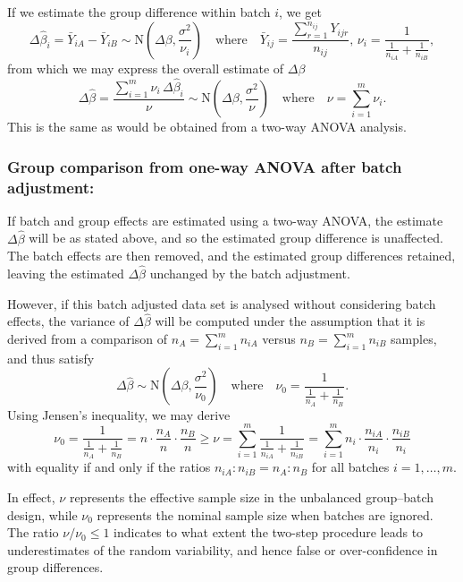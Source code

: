 \documentclass{bio}
\begin{document}
If we estimate the group difference within batch $i$, we get
\begin{equation}
\Delta\hat{\beta}_i=\bar{Y}_{iA}-\bar{Y}_{iB}\sim\text{N}\left(\Delta\beta,\frac{\sigma^2}{\nu_i}\right)
\quad\text{where}\quad
\bar{Y}_{ij}=\frac{\sum_{r=1}^{n_{ij}}Y_{ijr}}{n_{ij}},\,
\nu_i=\frac{1}{\frac{1}{n_{iA}}+\frac{1}{n_{iB}}},
\end{equation}
from which we may express the overall estimate of $\Delta\beta$
\begin{equation}
\Delta\hat{\beta}=\frac{\sum_{i=1}^m \nu_i\,\Delta\hat{\beta}_i}{\nu}
\sim\text{N}\left(\Delta\beta,\frac{\sigma^2}{\nu}\right)
\quad\text{where}\quad
\nu=\sum_{i=1}^m\nu_i.
\end{equation}
This is the same as would be obtained from a two-way ANOVA analysis.

\subsubsection{Group comparison from one-way ANOVA after batch adjustment:}

If batch and group effects are estimated using a two-way ANOVA, the estimate $\Delta\hat{\beta}$ will be as stated above, and so the estimated group difference is unaffected. The batch effects are then removed, and the estimated group differences retained, leaving the estimated $\Delta\hat{\beta}$ unchanged by the batch adjustment.

However, if this batch adjusted data set is analysed without considering batch effects, the variance of $\Delta\hat{\beta}$ will be computed under the assumption that it is derived from a comparison of $n_A=\sum_{i=1}^m n_{iA}$ versus $n_B=\sum_{i=1}^m n_{iB}$ samples, and thus satisfy
\begin{equation}
\Delta\hat{\beta}
\sim\text{N}\left(\Delta\beta,\frac{\sigma^2}{\nu_0}\right)
\quad\text{where}\quad
\nu_0=\frac{1}{\frac{1}{n_A}+\frac{1}{n_B}}.
\end{equation}
Using Jensen's inequality, we may derive
\begin{equation}
\nu_0
=\frac{1}{\frac{1}{n_A}+\frac{1}{n_B}}=n\cdot\frac{n_A}{n}\cdot\frac{n_B}{n}
\ge
\nu
=\sum_{i=1}^m \frac{1}{\frac{1}{n_{iA}}+\frac{1}{n_{iB}}}
=\sum_{i=1}^m n_i\cdot\frac{n_{iA}}{n_i}\cdot\frac{n_{iB}}{n_i}
\end{equation}
with equality if and only if the ratios $n_{iA}:n_{iB}=n_A:n_B$ for all batches $i=1,\ldots,m$.

In effect, $\nu$ represents the effective sample size in the unbalanced group--batch design, while $\nu_0$ represents the nominal sample size when batches are ignored. The ratio $\nu/\nu_0\le1$ indicates to what extent the two-step procedure leads to underestimates of the random variability, and hence false or over-confidence in group differences.
\end{document}
